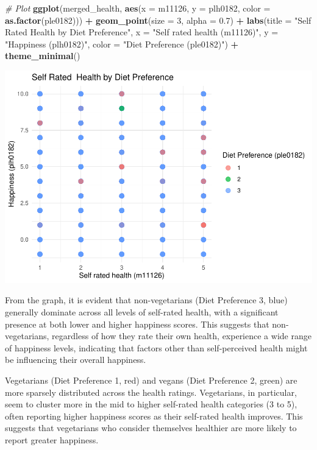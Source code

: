 \documentclass[
]{article}
\newenvironment{Shaded}{\begin{snugshade}}{\end{snugshade}}
\newcommand{\AttributeTok}[1]{\textcolor[rgb]{0.13,0.29,0.53}{#1}}
\newcommand{\CommentTok}[1]{\textcolor[rgb]{0.56,0.35,0.01}{\textit{#1}}}
\newcommand{\DecValTok}[1]{\textcolor[rgb]{0.00,0.00,0.81}{#1}}
\newcommand{\FloatTok}[1]{\textcolor[rgb]{0.00,0.00,0.81}{#1}}
\newcommand{\FunctionTok}[1]{\textcolor[rgb]{0.13,0.29,0.53}{\textbf{#1}}}
\newcommand{\NormalTok}[1]{#1}
\newcommand{\SpecialCharTok}[1]{\textcolor[rgb]{0.81,0.36,0.00}{\textbf{#1}}}
\newcommand{\StringTok}[1]{\textcolor[rgb]{0.31,0.60,0.02}{#1}}
\begin{document}
\begin{Shaded}
\begin{Highlighting}[]
\CommentTok{\# Plot}
\FunctionTok{ggplot}\NormalTok{(merged\_health, }\FunctionTok{aes}\NormalTok{(}\AttributeTok{x =}\NormalTok{ m11126, }\AttributeTok{y =}\NormalTok{ plh0182, }\AttributeTok{color =} \FunctionTok{as.factor}\NormalTok{(ple0182))) }\SpecialCharTok{+}
  \FunctionTok{geom\_point}\NormalTok{(}\AttributeTok{size =} \DecValTok{3}\NormalTok{, }\AttributeTok{alpha =} \FloatTok{0.7}\NormalTok{) }\SpecialCharTok{+}
  \FunctionTok{labs}\NormalTok{(}\AttributeTok{title =} \StringTok{"Self Rated  Health by Diet Preference"}\NormalTok{,}
       \AttributeTok{x =} \StringTok{"Self rated health (m11126)"}\NormalTok{,}
       \AttributeTok{y =} \StringTok{"Happiness (plh0182)"}\NormalTok{,}
       \AttributeTok{color =} \StringTok{"Diet Preference (ple0182)"}\NormalTok{) }\SpecialCharTok{+}
  \FunctionTok{theme\_minimal}\NormalTok{()}
\end{Highlighting}
\end{Shaded}

\includegraphics{Final-v2_files/figure-latex/self health~analysis-1.pdf}

From the graph, it is evident that non-vegetarians (Diet Preference 3,
blue) generally dominate across all levels of self-rated health, with a
significant presence at both lower and higher happiness scores. This
suggests that non-vegetarians, regardless of how they rate their own
health, experience a wide range of happiness levels, indicating that
factors other than self-perceived health might be influencing their
overall happiness.

Vegetarians (Diet Preference 1, red) and vegans (Diet Preference 2,
green) are more sparsely distributed across the health ratings.
Vegetarians, in particular, seem to cluster more in the mid to higher
self-rated health categories (3 to 5), often reporting higher happiness
scores as their self-rated health improves. This suggests that
vegetarians who consider themselves healthier are more likely to report
greater happiness.
\end{document}
